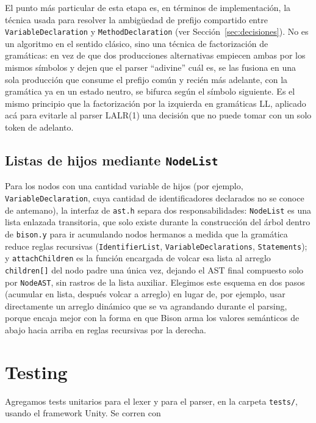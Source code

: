 \documentclass[11pt,a4paper]{article}
\begin{document}
El punto más particular de esta etapa es, en términos de implementación, la
técnica usada para resolver la ambigüedad de prefijo compartido entre
\texttt{VariableDeclaration} y \texttt{MethodDeclaration} (ver
Sección~\ref{sec:decisiones}). No es un algoritmo en el sentido clásico, sino
una técnica de factorización de gramáticas: en vez de que dos producciones
alternativas empiecen ambas por los mismos símbolos y dejen que el parser
``adivine'' cuál es, se las fusiona en una sola producción que consume el
prefijo común y recién más adelante, con la gramática ya en un estado neutro,
se bifurca según el símbolo siguiente. Es el mismo principio que la
factorización por la izquierda en gramáticas LL, aplicado acá para evitarle
al parser LALR(1) una decisión que no puede tomar con un solo token de
adelanto.

\subsection{Listas de hijos mediante \texttt{NodeList}}

Para los nodos con una cantidad variable de hijos (por ejemplo,
\texttt{VariableDeclaration}, cuya cantidad de identificadores declarados no
se conoce de antemano), la interfaz de \texttt{ast.h} separa dos
responsabilidades: \texttt{NodeList} es una lista enlazada transitoria, que
solo existe durante la construcción del árbol dentro de \texttt{bison.y} para
ir acumulando nodos hermanos a medida que la gramática reduce reglas
recursivas (\texttt{IdentifierList}, \texttt{VariableDeclarations},
\texttt{Statements}); y \texttt{attachChildren} es la función encargada de
volcar esa lista al arreglo \texttt{children[]} del nodo padre una única vez,
dejando el AST final compuesto solo por \texttt{NodeAST}, sin rastros de la
lista auxiliar. Elegimos este esquema en dos pasos (acumular en lista,
después volcar a arreglo) en lugar de, por ejemplo, usar directamente un
arreglo dinámico que se va agrandando durante el parsing, porque encaja mejor
con la forma en que Bison arma los valores semánticos de abajo hacia arriba
en reglas recursivas por la derecha.

\section{Testing}
\label{sec:tests}

Agregamos tests unitarios para el lexer y para el parser, en la carpeta
\texttt{tests/}, usando el framework Unity. Se corren con
\end{document}
